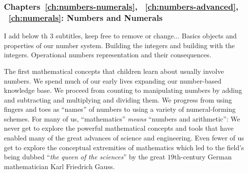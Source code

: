\subsubsection{Chapters~\ref{ch:numbers-numerals},
~\ref{ch:numbers-advanced}, ~\ref{ch:numerals}: Numbers and Numerals}

{\Denis I add below th 3 subtitles, keep free to remove or change...}
Basics objects and properties of our number system.
Building the integers and building with the integers.
Operational numbers representation and their consequences.

The first mathematical concepts that children learn about usually
involve numbers.  We spend much of our early lives expanding our
number-based knowledge base.  We proceed from counting to manipulating
numbers by adding and subtracting and multiplying and dividing them.
We progress from using fingers and toes as ``names'' of numbers to
using a variety of numeral-forming schemes.  For many of us,
``mathematics'' {\em means} ``numbers and arithmetic'': We never get
to explore the powerful mathematical concepts and tools that have
enabled many of the great advances of science and engineering.  Even
fewer of us get to explore the conceptual extremities of mathematics
which led to the field's being dubbed ``{\em the queen of the
  sciences}'' by the great $19$th-century German mathematician Karl
Friedrich Gauss. 

